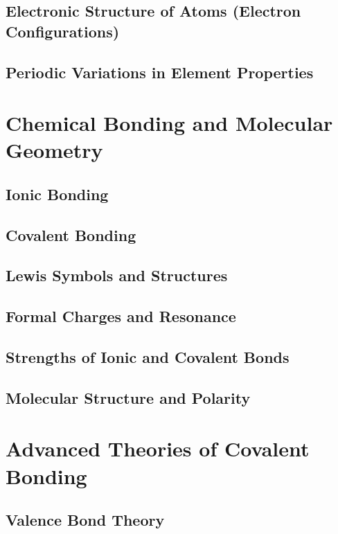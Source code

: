 \documentclass[12pt, openany, letterpaper]{memoir}
\begin{document}
\section{Electronic Structure of Atoms (Electron Configurations)}

\section{Periodic Variations in Element Properties}

\chapter{Chemical Bonding and Molecular Geometry}

\section{Ionic Bonding}

\section{Covalent Bonding}

\section{Lewis Symbols and Structures}

\section{Formal Charges and Resonance}

\section{Strengths of Ionic and Covalent Bonds}

\section{Molecular Structure and Polarity}

\chapter{Advanced Theories of Covalent Bonding}

\section{Valence Bond Theory}
\end{document}
